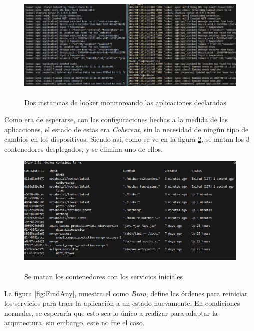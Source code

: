 \begin{figure}[H]
    \centering
    \caption{\\Dos instancias de looker monitoreando las aplicaciones declaradas}
    \label{fig:Looker2Apps}
    \includegraphics[width=0.9\linewidth]{images/Looker2Apps.png}
    \vspace{-4mm}
\end{figure}

Como era de esperarse, con las configuraciones hechas a la medida de las aplicaciones, el estado de estas era \textit{Coherent}, sin la necesidad de ningún tipo de cambios en los dispositivos. Siendo así, como se ve en la figura \ref{fig:KillThemAll}, se matan los 3 contenedores desplegados, y se elimina uno de ellos.

\begin{figure}[H]
    \centering
    \caption{\\Se matan los contenedores con los servicios iniciales}
    \label{fig:KillThemAll}
    \includegraphics[width=0.9\linewidth]{images/Killing.png}
    \vspace{-4mm}
\end{figure}

La figura \ref{fig:FindAny}, muestra el como \textit{Bran}, define las órdenes para reiniciar los servicios para traer la aplicación a un estado nuevamente. En condiciones normales, se esperaría que esto sea lo único a realizar para adaptar la arquitectura, sin embargo, este no fue el caso.

